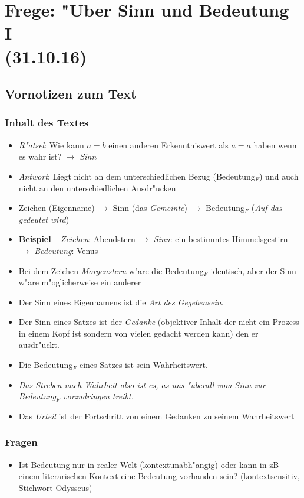 \documentclass[]{scrartcl}
\begin{document}
\newpage



\section{Frege: "Uber Sinn und Bedeutung I\\(31.10.16)}

\subsection{Vornotizen zum Text}
\subsubsection{Inhalt des Textes}
\begin{itemize}
  \item \emph{R"atsel}: Wie kann $a = b$ einen anderen Erkenntniswert als $ a = a$ haben wenn es wahr ist? $\rightarrow$ \emph{Sinn} 
  \item \emph{Antwort}: Liegt nicht an dem unterschiedlichen Bezug (Bedeutung$_{F}$) und auch nicht an den unterschiedlichen Ausdr"ucken
  \item Zeichen (Eigenname) $\rightarrow$ Sinn (das \emph{Gemeinte}) $\rightarrow$ Bedeutung$_{F}$ (\emph{Auf das gedeutet wird})
  \item \textbf{Beispiel} -- \emph{Zeichen}: Abendstern $\rightarrow$ \emph{Sinn}: ein bestimmtes Himmelsgestirn $\rightarrow$ \emph{Bedeutung}: Venus 
  \item Bei dem Zeichen \emph{Morgenstern} w"are die Bedeutung$_{F}$ identisch, aber der Sinn w"are m"oglicherweise ein anderer
  \item Der Sinn eines Eigennamens ist die \emph{Art des Gegebensein}.
  \item Der Sinn eines Satzes ist der \emph{Gedanke} (objektiver Inhalt der nicht ein Prozess in einem Kopf ist sondern von vielen gedacht werden kann) den er ausdr"uckt.
  \item Die Bedeutung$_{F}$ eines Satzes ist sein Wahrheitswert.
  \item \emph{Das Streben nach Wahrheit also ist es, as uns "uberall vom Sinn zur Bedeutung$_{F}$ vorzudringen treibt.}
  \item Das \emph{Urteil} ist der Fortschritt von einem Gedanken zu seinem Wahrheitswert
\end{itemize}
\subsubsection{Fragen}
\begin{itemize}
  \item Ist Bedeutung nur in realer Welt (kontextunabh"angig) oder kann in zB einem literarischen Kontext eine Bedeutung vorhanden sein? (kontextsensitiv, Stichwort Odysseus)
\end{itemize}
\end{document}
